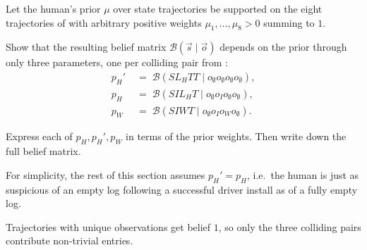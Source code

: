 \documentclass[11pt]{article}
\newcommand{\cB}{\mathcal{B}}
\begin{document}
\begin{exercise}
\label{prob:belief}
Let the human's prior $\mu$ over
state trajectories be supported on the eight trajectories of
 with arbitrary positive weights
$\mu_1, \dots, \mu_8 > 0$ summing to $1$.

Show that the resulting belief matrix
$\cB(\vec s \mid \vec o)$ depends on the prior through only three
parameters, one per colliding pair from :
\begin{align*}
p_H' &\;=\; \cB(SL_HTT \mid o_\emptyset o_\emptyset o_\emptyset o_\emptyset), \\
p_H  &\;=\; \cB(SIL_HT \mid o_\emptyset o_I o_\emptyset o_\emptyset), \\
p_W  &\;=\; \cB(SIWT \mid o_\emptyset o_I o_W o_\emptyset).
\end{align*}

Express each of $p_H, p_H', p_W$ in terms of the prior weights. Then
write down the full belief matrix.

For simplicity, the rest of this section assumes $p_H' = p_H$, i.e.\ the
human is just as suspicious of an empty log following a successful driver
install as of a fully empty log.
\end{exercise}

\begin{hint}
Trajectories with unique observations get belief $1$, so
only the three colliding pairs contribute non-trivial entries.
\end{hint}
\end{document}
